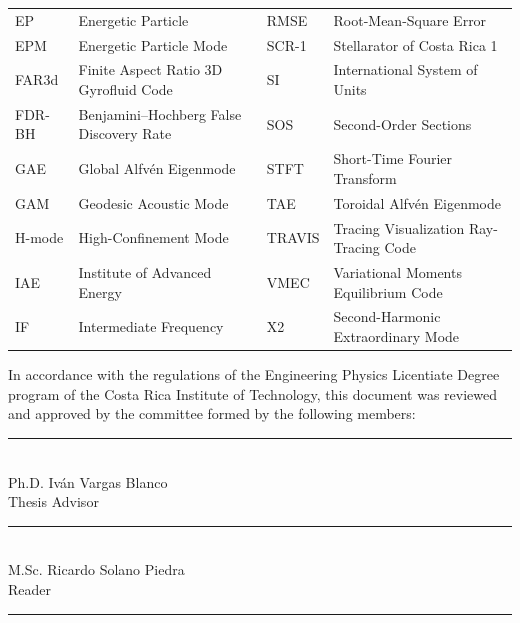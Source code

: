 \documentclass[12pt]{article}
\begin{document}
{\begin{tabularx}{\textwidth}{@{}l >{\raggedright\arraybackslash}X l >{\raggedright\arraybackslash}X@{}}
EP & Energetic Particle & RMSE & Root-Mean-Square Error \\
EPM & Energetic Particle Mode & SCR-1 & Stellarator of Costa Rica 1 \\
FAR3d & Finite Aspect Ratio 3D Gyrofluid Code & SI & International System of Units \\
FDR-BH & Benjamini--Hochberg False Discovery Rate & SOS & Second-Order Sections \\
GAE & Global Alfv\'en Eigenmode & STFT & Short-Time Fourier Transform \\
GAM & Geodesic Acoustic Mode & TAE & Toroidal Alfv\'en Eigenmode \\
H-mode & High-Confinement Mode & TRAVIS & Tracing Visualization Ray-Tracing Code \\
IAE & Institute of Advanced Energy & VMEC & Variational Moments Equilibrium Code \\
IF & Intermediate Frequency & X2 & Second-Harmonic Extraordinary Mode \\
\bottomrule
\end{tabularx}}

\clearpage
{}
{}
\thispagestyle{plain}

\vspace*{1.0cm}

\noindent
In accordance with the regulations of the Engineering Physics Licentiate Degree program of the Costa Rica Institute of Technology, this document was reviewed and approved by the committee formed by the following members:

\vspace{2.2cm}

\begin{center}
    \rule{8cm}{0.4pt}\\[0.25cm]
    Ph.D. Iván Vargas Blanco\\[0.15cm]
    Thesis Advisor

    \vspace{2.2cm}

    \rule{8cm}{0.4pt}\\[0.25cm]
    M.Sc. Ricardo Solano Piedra\\[0.15cm]
    Reader
\end{center}

\vfill

\noindent\rule{\textwidth}{0.4pt}\par\vspace{0.6em}
\begin{center}
    \doclicenseImage\par\vspace{0.6em}
    \begin{minipage}{0.82\linewidth}
        \centering\footnotesize
        \doclicenseLongText
    \end{minipage}
\end{center}
\end{document}
